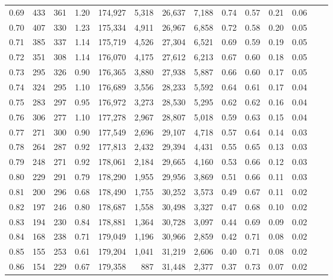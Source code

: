 \begin{tabular}{rrrrrrrrrrrrrr}
0.69 &    433 &  361 &    1.20 &  174,927 &    5,318 &  26,637 &   7,188 &  0.74 &  0.57 &  0.21 &      0.06 \\
0.70 &    407 &  330 &    1.23 &  175,334 &    4,911 &  26,967 &   6,858 &  0.72 &  0.58 &  0.20 &      0.05 \\
0.71 &    385 &  337 &    1.14 &  175,719 &    4,526 &  27,304 &   6,521 &  0.69 &  0.59 &  0.19 &      0.05 \\
0.72 &    351 &  308 &    1.14 &  176,070 &    4,175 &  27,612 &   6,213 &  0.67 &  0.60 &  0.18 &      0.05 \\
0.73 &    295 &  326 &    0.90 &  176,365 &    3,880 &  27,938 &   5,887 &  0.66 &  0.60 &  0.17 &      0.05 \\
0.74 &    324 &  295 &    1.10 &  176,689 &    3,556 &  28,233 &   5,592 &  0.64 &  0.61 &  0.17 &      0.04 \\
0.75 &    283 &  297 &    0.95 &  176,972 &    3,273 &  28,530 &   5,295 &  0.62 &  0.62 &  0.16 &      0.04 \\
0.76 &    306 &  277 &    1.10 &  177,278 &    2,967 &  28,807 &   5,018 &  0.59 &  0.63 &  0.15 &      0.04 \\
0.77 &    271 &  300 &    0.90 &  177,549 &    2,696 &  29,107 &   4,718 &  0.57 &  0.64 &  0.14 &      0.03 \\
0.78 &    264 &  287 &    0.92 &  177,813 &    2,432 &  29,394 &   4,431 &  0.55 &  0.65 &  0.13 &      0.03 \\
0.79 &    248 &  271 &    0.92 &  178,061 &    2,184 &  29,665 &   4,160 &  0.53 &  0.66 &  0.12 &      0.03 \\
0.80 &    229 &  291 &    0.79 &  178,290 &    1,955 &  29,956 &   3,869 &  0.51 &  0.66 &  0.11 &      0.03 \\
0.81 &    200 &  296 &    0.68 &  178,490 &    1,755 &  30,252 &   3,573 &  0.49 &  0.67 &  0.11 &      0.02 \\
0.82 &    197 &  246 &    0.80 &  178,687 &    1,558 &  30,498 &   3,327 &  0.47 &  0.68 &  0.10 &      0.02 \\
0.83 &    194 &  230 &    0.84 &  178,881 &    1,364 &  30,728 &   3,097 &  0.44 &  0.69 &  0.09 &      0.02 \\
0.84 &    168 &  238 &    0.71 &  179,049 &    1,196 &  30,966 &   2,859 &  0.42 &  0.71 &  0.08 &      0.02 \\
0.85 &    155 &  253 &    0.61 &  179,204 &    1,041 &  31,219 &   2,606 &  0.40 &  0.71 &  0.08 &      0.02 \\
0.86 &    154 &  229 &    0.67 &  179,358 &      887 &  31,448 &   2,377 &  0.37 &  0.73 &  0.07 &      0.02 \\

\end{tabular}
